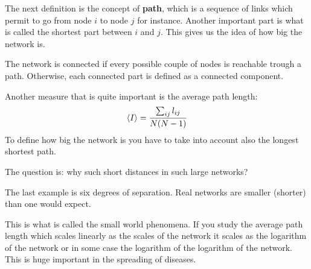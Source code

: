 \documentclass[../main/main.tex]{subfiles}
\begin{document}
The next definition is the concept of \textbf{path}, which is a sequence of links which permit to go from node \( i \) to node \( j \) for instance.
Another important part is what is called the shortest part between \( i  \) and \( j \). This gives us the idea of how big the network is.

The network is connected if every possible couple of nodes is reachable trough a path. Otherwise, each connected part is defined as a connected component.

Another measure that is quite important is the average path length:
\begin{equation*}
  \expval{I} = \frac{\sum_{ij}^{} l_{ij} }{N(N-1)}
\end{equation*}
To define how big the network is you have to take into account also the longest shortest path.

The question is: why such short distances in such large networks?

The last example is six degrees of separation. Real networks are smaller (shorter) than one would expect.

This is what is called the small world phenomena. If you study the average path length which scales linearly as the scales of the network it scales as the logarithm of the network or in some case the logarithm of the logarithm of the network. This is huge important in the spreading of diseases. 
\end{document}
